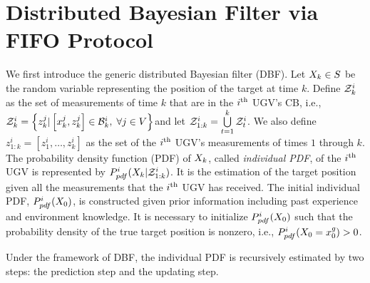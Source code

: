 \section{Distributed Bayesian Filter via FIFO Protocol}\label{sec:\proto-dbf}
	We first introduce the generic distributed Bayesian filter (DBF).
	Let $X_k\in S$ be the random variable representing the position of the target at time $k$.
	Define $\mathcal{Z}^i_k$ as the set of measurements of time $k$ that are in the $i^\text{th}$ UGV's CB, i.e., \small$\mathcal{Z}^i_k=\left\lbrace z^j_k| \left[x^j_k,z^j_k\right]\in \mathcal{B}^i_k,\; \forall j\in V\right\rbrace$\normalsize and let $\mathcal{Z}^i_{1:k} = \bigcup\limits_{t=1}^k \mathcal{Z}^i_t$. 
	We also define $z^i_{1:k}=\left[z^i_1,\dots,z^i_k\right]$ as the set of the $i^\text{th}$ UGV's measurements of times $1$ through $k$.
	The probability density function (PDF) of $X_k$, called \textit{individual PDF}, of the $i^\text{th}$ UGV is represented by
	$P^i_{pdf}(X_{k}|\mathcal{Z}^i_{1:k})$.
	It is the estimation of the target position given all the measurements that the $i^\text{th}$ UGV has received.	
	The initial individual PDF, $P^i_{pdf}(X_0)$, is constructed %
	given prior information including past experience and environment knowledge. 
	It is necessary to initialize $P^i_{pdf}(X_0)$ such that the probability density of the true target position is nonzero, i.e., $P^i_{pdf}(X_0=x^g_0)> 0$.
	
	Under the framework of DBF, the individual PDF is recursively estimated by two steps: the prediction step and the updating step. 
	
